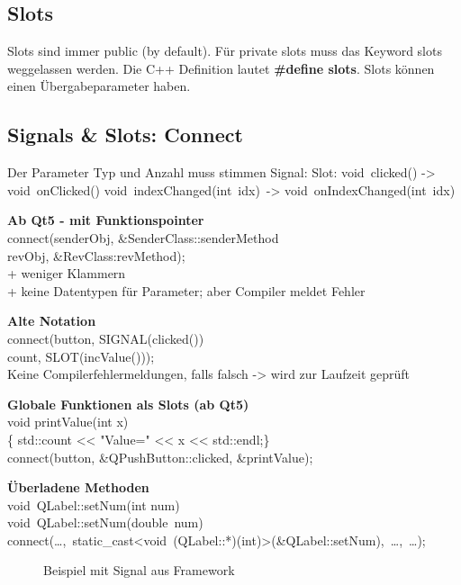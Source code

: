 \subsection{Slots}
Slots sind immer public (by default). Für private slots muss das Keyword slots weggelassen werden. Die C++ Definition lautet \textbf{\#define slots}. Slots können einen Übergabeparameter haben. 

\subsection{Signals \& Slots: Connect}

Der Parameter Typ und Anzahl muss stimmen
Signal: Slot:
void clicked() -> void onClicked()
void indexChanged(int idx) -> void onIndexChanged(int idx)


\textbf{Ab Qt5 - mit Funktionspointer} \\
connect(senderObj, \&SenderClass::senderMethod \\
revObj, \&RevClass:revMethod); \\
+ weniger Klammern  \\
+ keine Datentypen für Parameter; aber Compiler meldet Fehler

\textbf{Alte Notation} \\
connect(button, SIGNAL(clicked()) \\
count, SLOT(incValue())); \\
Keine Compilerfehlermeldungen, falls falsch -> wird zur Laufzeit geprüft

\textbf{Globale Funktionen als Slots (ab Qt5)} \\
void printValue(int x) \\
\{ 	std::count << "Value=" << x << std::endl;\} \\
connect(button, \&QPushButton::clicked, \&printValue); 


\textbf{Überladene Methoden} \\
void QLabel::setNum(int num) \\
void QLabel::setNum(double num) \\
connect(…, static\_cast<void (QLabel::*)(int)>(\&QLabel::setNum), …, …);

\begin{figure}[ht]
	\centering
	\caption[]{Beispiel mit Signal aus Framework}
\end{figure}

